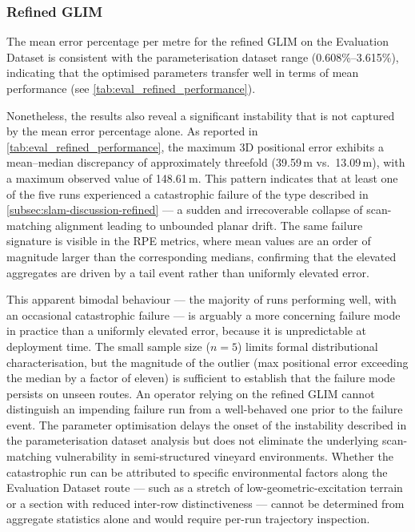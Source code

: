 \subsubsection{Refined GLIM}

The mean error percentage per metre for the refined GLIM on the Evaluation Dataset is consistent with the parameterisation dataset range (0.608\%--3.615\%), indicating that the optimised parameters transfer well in terms of mean performance (see \cref{tab:eval_refined_performance}).

Nonetheless, the results also reveal a significant instability that is not captured by the mean error percentage alone. As reported in \cref{tab:eval_refined_performance}, the maximum 3D positional error exhibits a mean--median discrepancy of approximately threefold (39.59\,m vs.\ 13.09\,m), with a maximum observed value of 148.61\,m. This pattern indicates that at least one of the five runs experienced a catastrophic failure of the type described in \cref{subsec:slam-discussion-refined} — a sudden and irrecoverable collapse of scan-matching alignment leading to unbounded planar drift. The same failure signature is visible in the RPE metrics, where mean values are an order of magnitude larger than the corresponding medians, confirming that the elevated aggregates are driven by a tail event rather than uniformly elevated error.

This apparent bimodal behaviour — the majority of runs performing well, with an occasional catastrophic failure — is arguably a more concerning failure mode in practice than a uniformly elevated error, because it is unpredictable at deployment time. The small sample size ($n = 5$) limits formal distributional characterisation, but the magnitude of the outlier (max positional error exceeding the median by a factor of eleven) is sufficient to establish that the failure mode persists on unseen routes. An operator relying on the refined GLIM cannot distinguish an impending failure run from a well-behaved one prior to the failure event. The parameter optimisation delays the onset of the instability described in the parameterisation dataset analysis but does not eliminate the underlying scan-matching vulnerability in semi-structured vineyard environments. Whether the catastrophic run can be attributed to specific environmental factors along the Evaluation Dataset route — such as a stretch of low-geometric-excitation terrain or a section with reduced inter-row distinctiveness — cannot be determined from aggregate statistics alone and would require per-run trajectory inspection.

